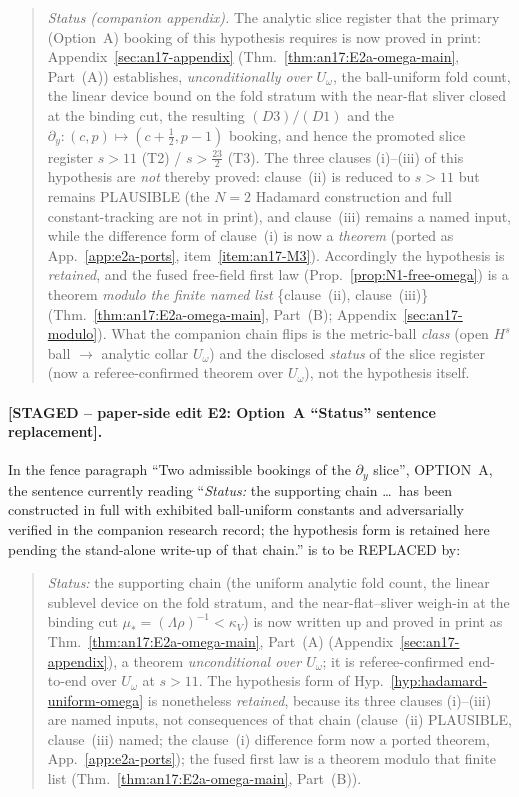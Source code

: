 \begin{quote}\small
\emph{Status (companion appendix).}  The analytic slice register that
the primary (Option~A) booking of this hypothesis requires is now proved
in print: Appendix~\ref{sec:an17-appendix}
(Thm.~\ref{thm:an17:E2a-omega-main}, Part~(A)) establishes,
\emph{unconditionally over $U_\omega$}, the ball-uniform fold count, the
linear device bound on the fold stratum with the near-flat sliver closed
at the binding cut, the resulting $(D3)/(D1)$ and the
$\partial_y:(c,p)\mapsto(c+\tfrac12,p-1)$ booking, and hence the promoted
slice register $s>11$ (T2) / $s>\tfrac{23}{2}$ (T3).  The three clauses
(i)--(iii) of this hypothesis are \emph{not} thereby proved: clause~(ii)
is reduced to $s>11$ but remains PLAUSIBLE (the $N=2$ Hadamard
construction and full constant-tracking are not in print), and clause~(iii) remains a named input, while the difference form of
clause~(i) is now a \emph{theorem} (ported as App.~\ref{app:e2a-ports},
item~\ref{item:an17-M3}).  Accordingly the
hypothesis is \emph{retained}, and the fused free-field first law
(Prop.~\ref{prop:N1-free-omega}) is a theorem
\emph{modulo the finite named list} \{clause~(ii), clause~(iii)\}
(Thm.~\ref{thm:an17:E2a-omega-main}, Part~(B);
Appendix~\ref{sec:an17-modulo}).  What the companion chain flips is the
metric-ball \emph{class} (open $H^s$ ball $\to$ analytic collar
$U_\omega$) and the disclosed \emph{status} of the slice register (now a
referee-confirmed theorem over $U_\omega$), not the hypothesis itself.
\end{quote}

\paragraph*{[STAGED -- paper-side edit E2: Option~A ``Status'' sentence
replacement].}  In the fence paragraph ``Two admissible bookings of the
$\partial_y$ slice'', OPTION~A, the sentence currently reading
``\emph{Status:} the supporting chain \dots\ has been constructed in full
with exhibited ball-uniform constants and adversarially verified in the
companion research record; the hypothesis form is retained here pending
the stand-alone write-up of that chain.'' is to be REPLACED by:

\begin{quote}\small
\emph{Status:} the supporting chain (the uniform analytic fold count, the
linear sublevel device on the fold stratum, and the near-flat--sliver
weigh-in at the binding cut $\mu_*=(\Lambda\rho)^{-1}<\kappa_V$) is now
written up and proved in print as
Thm.~\ref{thm:an17:E2a-omega-main}, Part~(A)
(Appendix~\ref{sec:an17-appendix}), a theorem \emph{unconditional over
$U_\omega$}; it is referee-confirmed end-to-end over $U_\omega$ at
$s>11$.  The hypothesis form of
Hyp.~\ref{hyp:hadamard-uniform-omega} is nonetheless \emph{retained},
because its three clauses (i)--(iii) are named inputs, not consequences
of that chain (clause~(ii) PLAUSIBLE, clause~(iii) named; the clause~(i)
difference form now a ported theorem, App.~\ref{app:e2a-ports}); the fused
first law is a theorem modulo that finite list
(Thm.~\ref{thm:an17:E2a-omega-main}, Part~(B)).
\end{quote}

